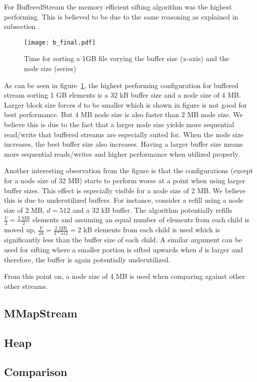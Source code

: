 For BufferedStream the memory efficient sifting algorithm was the highest performing. This is believed to be due to the same reasoning as explained in subsection .

\begin{figure}[h!]
  \centering
  \texttt{[image: b\_final.pdf]}
  \caption{Time for sorting a 1GB file varying the buffer size (x-axis) and the node size (series)}
  \label{fig:b_final}
\end{figure}

As can be seen in figure~\ref{fig:b_final}, the highest performing configuration for buffered stream sorting 1 GB elements is a 32 kB buffer size and a node size of 4 MB. Larger block size forces $d$ to be smaller which is shown in figure  is not good for best performance. But 4 MB node size is also faster than 2 MB node size. We believe this is due to the fact that a larger node size yields more sequential read/write that buffered streams are especially suited for. When the node size increases, the best buffer size also increases. Having a larger buffer size means more sequential reads/writes and higher performance when utilized properly.

Another interesting observation from the figure is that the configurations (except for a node size of 32 MB) starts to perform worse at a point when using larger buffer sizes. This effect is especially visible for a node size of 2 MB. We believe this is due to underutilized buffers. For instance, consider a refill using a node size of 2 MB, $d=512$ and a 32 kB buffer. The algorithm potentially refills $\frac{V}{2}=\frac{\textrm{2 MB}}{2}$ elements and assuming an equal number of elements from each child is moved up, $\frac{V}{2d}=\frac{\textrm{2 MB}}{2*512}=\textrm{2 kB}$ elements from each child is used which is significantly less than the buffer size of each child. A similar argument can be used for sifting where a smaller portion is sifted upwards when $d$ is larger and therefore, the buffer is again potentially underutilized.


From this point on, a node size of 4 MB is used when comparing against other other streams.

\subsection{MMapStream}


\subsection{Heap}


\subsection{Comparison}